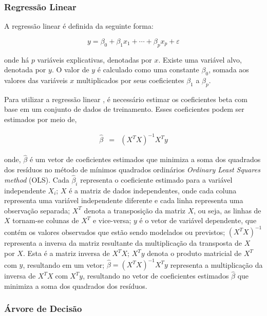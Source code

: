  
 \subsubsection{Regress\~ao Linear}
 
 A regressão linear é definida da seguinte forma:
 
 \begin{equation}
 	y = \beta_0 + \beta_1 x_1 + \cdots + \beta_p x_p + \varepsilon \label{eq:lr}
 \end{equation}
 
 \noindent onde há $p$ variáveis explicativas, denotadas por $x$. Existe uma variável alvo, denotada por $y$. O valor de $y$ é calculado como uma constante $\beta_0$, somada aos valores das variáveis $x$ multiplicados por seus coeficientes $\beta_1$ a $\beta_p$.
 
 
 Para utilizar a regressão linear \cite{korstanje2021}, é necessário estimar os coeficientes beta com base em um conjunto de dados de treinamento. Esses coeficientes podem ser estimados por meio de,
 
 \begin{eqnarray}
 	\hat{\beta}&=&\left(X^T X\right)^{-1} X^T y\label{eq:ols}
 \end{eqnarray}
 
 \noindent onde, $\hat{\beta}$ é um vetor de coeficientes estimados que minimiza a soma dos quadrados dos resíduos no método de mínimos quadrados ordinários  \textit{Ordinary Least Squares method} (OLS). Cada $\hat{\beta}_i$ representa o coeficiente estimado para a variável independente $X_i$;
 $X$ é a matriz de dados independentes, onde cada coluna representa uma variável independente diferente e cada linha representa uma observação separada;
 $X^T$ denota a transposição da matriz $X$, ou seja, as linhas de $X$ tornam-se colunas de $X^T$ e vice-versa;
 $y$ é o vetor de variável dependente, que contém os valores observados que estão sendo modelados ou previstos;
 $\left(X^T X\right)^{-1}$ representa a inversa da matriz resultante da multiplicação da transposta de $X$ por $X$. Esta é a matriz inversa de $X^T X$;
 $X^T y$ denota o produto matricial de $X^T$ com $y$, resultando em um vetor;
 $\hat{\beta}=\left(X^T X\right)^{-1} X^T y$ representa a multiplicação da inversa de $X^T X \operatorname{com} X^T y$, resultando no vetor de coeficientes estimados $\hat{\beta}$ que minimiza a soma dos quadrados dos resíduos.
 
 
 \subsubsection{\'Arvore de Decis\~ao}
 
